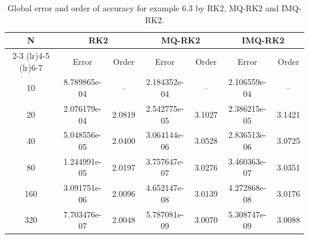 \documentclass[a4paper, preprint,11pt]{elsarticle}
\numberwithin{equation}{section}
\begin{document}
\begin{table}[htbp!]
    \centering
     \caption{Global error and order of accuracy for example 6.3 by RK2, MQ-RK2 and IMQ-RK2.}
    \begin{tabular}{c c c c c c c}
        \toprule
        N & \multicolumn{2}{c}{RK2}  & \multicolumn{2}{c}{MQ-RK2} & \multicolumn{2}{c}{IMQ-RK2} \\
        \cmidrule(lr){2-3} \cmidrule(lr){4-5}  \cmidrule(lr){6-7}
          & Error & Order & Error & Order & Error & Order \\
        \midrule
        10  & 8.789865e-04   & -- &2.184352e-04 & -- & 2.106559e-04    & --    \\
        20  & 2.076179e-04   & 2.0819 & 2.542775e-05 & 3.1027 & 2.386215e-05  &  3.1421 \\
        40  &5.048556e-05    &  2.0400 & 3.064144e-06 &3.0528 & 2.836513e-06  & 3.0725 \\
        80  & 1.244991e-05   & 2.0197 & 3.757647e-07 & 3.0276 & 3.460363e-07  & 3.0351 \\
        160 & 3.091751e-06  & 2.0096 & 4.652147e-08&  3.0139 & 4.272868e-08    & 3.0176 \\
        320 & 7.703476e-07 & 2.0048 &5.787081e-09  &  3.0070 & 5.308747e-09  & 3.0088\\
        \bottomrule
    \end{tabular}
\end{table}
\end{document}
